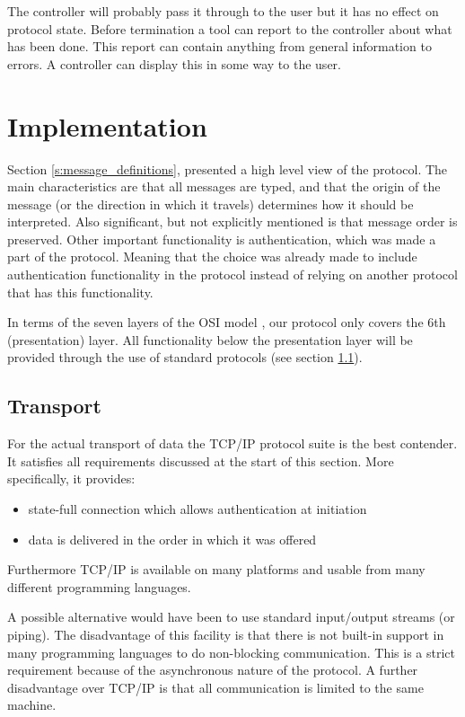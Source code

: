 \documentclass{article}
\begin{document}
   \noindent The controller will probably pass it through to the user but
   it has no effect on protocol state. Before termination a tool can report to
   the controller about what has been done. This report can contain anything
   from general information to errors. A controller can display this in some
   way to the user.

 \section{Implementation} \label{s:protocol_implementation}

   Section \ref{s:message_definitions}, presented a high level view of the
   protocol. The main characteristics are that all messages are typed, and that
   the origin of the message (or the direction in which it travels) determines
   how it should be interpreted. Also significant, but not explicitly mentioned
   is that message order is preserved. Other important functionality is
   authentication, which was made a part of the protocol.  Meaning that the
   choice was already made to include authentication functionality in the
   protocol instead of relying on another protocol that has this functionality.

   In terms of the seven layers of the OSI model \cite{Day1983}, our protocol
   only covers the 6th (presentation) layer. All functionality below the
   presentation layer will be provided through the use of standard protocols
   (see section \ref{ss:transport}).
   
  \subsection{Transport} \label{ss:transport}

   For the actual transport of data the TCP/IP protocol suite is the best
   contender. It satisfies all requirements discussed at the start of this
   section. More specifically, it provides:
    \begin{itemize}
     \item state-full connection which allows authentication at initiation
     \item data is delivered in the order in which it was offered
    \end{itemize}
   Furthermore TCP/IP is available on many platforms and usable from many
   different programming languages.

   A possible alternative would have been to use standard input/output streams
   (or piping).  The disadvantage of this facility is that there is not
   built-in support in many programming languages to do non-blocking
   communication. This is a strict requirement because of the asynchronous
   nature of the protocol. A further disadvantage over TCP/IP is that all
   communication is limited to the same machine.
\end{document}
